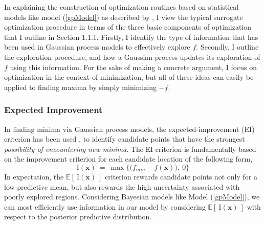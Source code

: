 \documentclass[12pt]{article}
\def \Eix {
	\mathbb{E}\left[~\text{I}(\bm{x})~\right]
}
\def \ix {
	\text{I}(\bm{x})
}
\begin{document}
	In explaining the construction of optimization routines based on statistical models like model (\ref{gpModel}) as described by \cite{taddyOpt}, I view the typical surrogate optimization procedure in terms of the three basic components of optimization that I outline in Section 1.1.1. 
	Firstly, I identify the type of information that has been used in Gaussian process models to effectively explore $f$.
	Secondly, I outline the exploration procedure, and how a Gaussian process updates its exploration of $f$ using this information.
	For the sake of making a concrete argument, I focus
	on optimization in the context of minimization, but all of these ideas can easily be applied to finding maxima by simply minimizing $-f$.

	\subsubsection{Expected Improvement}

	In finding minima via Gaussian process models, the expected-improvement (EI) criterion has been used \cite{tgp2}, \cite{taddyOpt} to identify candidate points that have the strongest {\it possibility of encountering new minima}.
	The EI criterion is fundamentally based on the improvement criterion for each candidate location of the following form,
	\begin{equation}
	\ix~=~ \max \Big\{ \big(f_{min} - f(\bm{x})\big), ~0 \Big\}
	\label{ix}
	\end{equation}
	In expectation, the $\Eix$ criterion rewards candidate points not only for a low predictive mean, but also rewards the high uncertainty associated with poorly explored regions.
	Considering Bayesian models like Model (\ref{gpModel}), we can most efficiently use information in our model by considering $\Eix$ with respect to the posterior predictive distribution.
	
	
\end{document}
